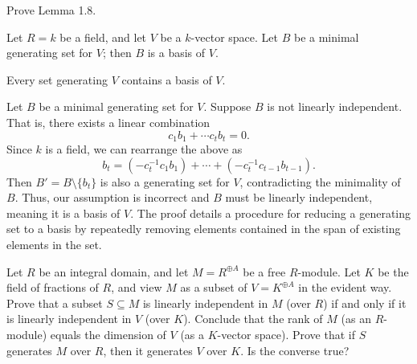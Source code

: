 \documentclass[../../master.tex]{subfiles}
\begin{document}
\begin{problem}
    Prove Lemma 1.8.
    \begin{proposition}[Lemma 1.8]
        Let $R = k$ be a field, and let $V$ be a $k$-vector space.
        Let $B$ be a \textup{minimal} generating set for $V$;
        then $B$ is a basis of $V$.

        Every set generating $V$ contains a basis of $V$.
    \end{proposition}
\end{problem}

\begin{solution}
    Let $B$ be a minimal generating set for $V$.
    Suppose $B$ is not linearly independent.
    That is, there exists a linear combination
    \[
    c_1 b_1 + \cdots c_t b_t = 0.
    \]
    Since $k$ is a field, we can rearrange the above as
    \[
        b_t = (-c_t^{-1} c_1 b_1) + \cdots + (-c_t^{-1} c_{t - 1} b_{t-1}).
    \]
    Then $B' = B \setminus \{b_t\}$ is also a generating set for $V$, contradicting the minimality of $B$.
    Thus, our assumption is incorrect and $B$ must be linearly independent, meaning it is a basis of $V$.
    The proof details a procedure for reducing a generating set to a basis by repeatedly removing elements contained in the span of existing elements in the set.
\end{solution}

\begin{problem}
    Let $R$ be an integral domain, and let $M = R^{\oplus A}$ be a free $R$-module.
    Let $K$ be the field of fractions of $R$, and view $M$ as a subset of $V = K^{\oplus A}$ in the evident way.
    Prove that a subset $S \subseteq M$ is linearly independent in $M$ (over $R$) if and only if it is linearly independent in $V$ (over $K$).
    Conclude that the rank of $M$ (as an $R$-module) equals the dimension of $V$ (as a $K$-vector space).
    Prove that if $S$ generates $M$ over $R$, then it generates $V$ over $K$.
    Is the converse true?
\end{problem}
\end{document}
